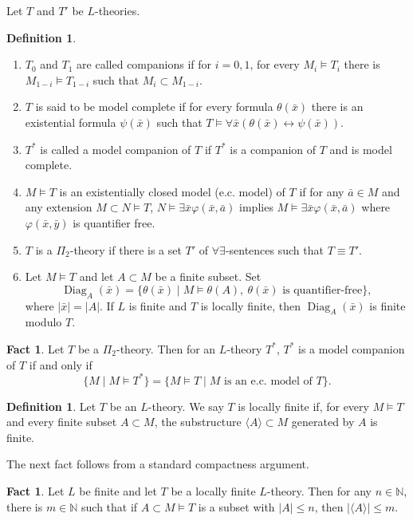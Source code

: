 \documentclass[11pt,reqno]{article}
\theoremstyle{definition}
\newtheorem{definition}[theorem]{Definition}
\newtheorem{fact}[theorem]{Fact}
\theoremstyle{remark}
\DeclareMathOperator{\Diag}{Diag}
\begin{document}
Let $T$ and $T'$ be $L$-theories.
\begin{definition}
    \begin{enumerate}
        \item $T_0$ and $T_1$ are called companions if for $i=0,1$, for every $M_i\models T_i$ there is $M_{1-i}\models T_{1-i}$ such that $M_i\subset M_{1-i}$.
        \item $T$ is said to be model complete if for every formula $\theta(\bar x)$ there is an existential formula $\psi(\bar x)$ such that $T\models \forall \bar x(\theta(\bar x)\leftrightarrow \psi(\bar x))$.
        \item $T^*$ is called a model companion of $T$ if $T^*$ is a companion of $T$ and is model complete.
        \item $M\models T$ is an existentially closed model (e.c. model) of $T$ if for any $\bar a\in M$ and any extension $M\subset N\models T$, $N\models \exists \bar x\varphi(\bar x,\bar a)$ implies $M\models \exists \bar x\varphi(\bar x,\bar a)$ where $\varphi(\bar x,\bar y)$ is quantifier free.
        \item $T$ is a $\Pi_2$-theory if there is a set $T'$ of $\forall\exists$-sentences such that $T\equiv T'$.
        \item Let $M\models T$ and let $A\subset M$ be a finite subset. Set
        \[
            \Diag_A(\bar x)=\{\theta(\bar x)\mid M\models\theta(A),
            \ \theta(\bar x)\text{ is quantifier-free}\},
        \]
        where $|\bar x|=|A|$. If $L$ is finite and $T$ is locally finite,
        then $\Diag_A(\bar x)$ is finite modulo $T$.
    \end{enumerate}
\end{definition}

\begin{fact}
    Let $T$ be a $\Pi_2$-theory.
    Then for an $L$-theory $T^*$, $T^*$ is a model companion of $T$ if and only if 
    \[
        \{M\mid M\models T^*\}=\{M\models T\mid M\text{ is an e.c. model of $T$}\}.
    \]
\end{fact}

\begin{definition}
    Let $T$ be an $L$-theory.
    We say $T$ is locally finite if, for every $M\models T$ and every finite subset $A\subset M$, the substructure $\langle A\rangle \subset M$ generated by $A$ is finite.
\end{definition}

The next fact follows from a standard compactness argument.
\begin{fact}
    Let $L$ be finite and let $T$ be a locally finite $L$-theory.
    Then for any $n\in\mathbb N$, there is $m\in\mathbb N$ such that if $A\subset M\models T$ is a subset with $|A|\leq n$, then $|\langle A\rangle| \leq m$.
\end{fact}
\end{document}
